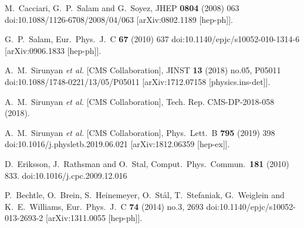 \documentclass[12pt]{article}
\begin{document}
\begin{thebibliography}{99}
  M.~Cacciari, G.~P.~Salam and G.~Soyez,
  JHEP {\bf 0804} (2008) 063
  doi:10.1088/1126-6708/2008/04/063
  [arXiv:0802.1189 [hep-ph]].


  G.~P.~Salam,
  Eur.\ Phys.\ J.\ C {\bf 67} (2010) 637
  doi:10.1140/epjc/s10052-010-1314-6
  [arXiv:0906.1833 [hep-ph]].


  A.~M.~Sirunyan {\it et al.} [CMS Collaboration],
  JINST {\bf 13} (2018) no.05,  P05011
  doi:10.1088/1748-0221/13/05/P05011
  [arXiv:1712.07158 [physics.ins-det]].

A.~M.~Sirunyan {\it et al.} [CMS Collaboration],
Tech. Rep. CMS-DP-2018-058 (2018).


  A.~M.~Sirunyan {\it et al.} [CMS Collaboration],
  Phys.\ Lett.\ B {\bf 795} (2019) 398
  doi:10.1016/j.physletb.2019.06.021
  [arXiv:1812.06359 [hep-ex]].


  D.~Eriksson, J.~Rathsman and O.~Stal,
  Comput.\ Phys.\ Commun.\  {\bf 181} (2010) 833.
  doi:10.1016/j.cpc.2009.12.016


  P.~Bechtle, O.~Brein, S.~Heinemeyer, O.~Stål, T.~Stefaniak, G.~Weiglein and K.~E.~Williams,
  Eur.\ Phys.\ J.\ C {\bf 74} (2014) no.3,  2693
  doi:10.1140/epjc/s10052-013-2693-2
  [arXiv:1311.0055 [hep-ph]].



\end{thebibliography}
\end{document}
